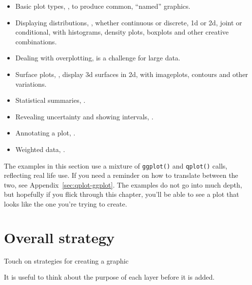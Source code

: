 \begin{itemize}
  \item Basic plot types, , to produce common, ``named'' graphics.
  
  \item Displaying distributions, , whether continuous or discrete, 1d or 2d, joint or conditional, with histograms, density plots, boxplots and other creative combinations.
  
  \item Dealing with overplotting,  is a challenge for large data.

  \item Surface plots, , display 3d surfaces in 2d, with imageplots, contours and other variations.

  \item Statistical summaries, .

  \item Revealing uncertainty and showing intervals, .


  \item Annotating a plot, .

  \item Weighted data, .
  
\end{itemize}

The examples in this section use a mixture of {\tt ggplot()} and {\tt qplot()} calls, reflecting real life use.  If you need a reminder on how to translate between the two, see Appendix~\ref{sec:qplot-ggplot}.  The examples do not go into much depth, but hopefully if you flick through this chapter, you'll be able to see a plot that looks like the one you're trying to create.

\section{Overall strategy}
\label{sec:strategy}

Touch on strategies for creating a graphic

It is useful to think about the purpose of each layer before it is added.  

